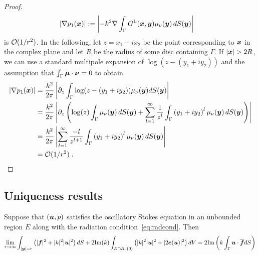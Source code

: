 \begin{proof}
\begin{align}
|\nabla p_1({\boldsymbol x})| &:= \left |-k^2 \nabla \int_\Gamma G^{\textrm{L}}({\boldsymbol x},{\boldsymbol y})
\mu_\nu({\boldsymbol y}) \, dS({\boldsymbol y}) \right |
\end{align}
is $\mathcal{O} (1/r^2)$. In the following, let $z = x_1 + i x_2$ be the
point corresponding to ${\boldsymbol x}$ in the complex plane and let $R$
be the radius of some disc containing $\Gamma$. If $|{\boldsymbol x}| > 2R$,
we can use a standard multipole expansion of $\log(z-(y_1+iy_2))$
and the assumption that $\int_\Gamma {\boldsymbol \mu} \cdot {\boldsymbol \nu} = 0$
to obtain
\begin{align}
|\nabla p_1({\boldsymbol x})| &= \frac{k^2}{2\pi} \left |  \partial_z \int_\Gamma \log(z-(y_1+iy_2))
\mu_\nu({\boldsymbol y}) dS({\boldsymbol y}) \right | \\
&= \frac{k^2}{2\pi} \left |  \partial_z  \left ( \log(z) \int_\Gamma \mu_\nu({\boldsymbol y}) \, dS({\boldsymbol y})
+ \sum_{l=1}^\infty \frac{1}{z^l} \int_\Gamma \left( y_1+iy_2 \right)^l \mu_\nu({\boldsymbol y}) \, dS({\boldsymbol y})
\right ) \right | \\
&= \frac{k^2}{2\pi} \left | \sum_{l=1}^\infty \frac{-l}{z^{l+1}}
\int_\Gamma \left( y_1+iy_2 \right)^l \mu_\nu({\boldsymbol y}) \, dS({\boldsymbol y}) \right | \\
&= \mathcal{O} (1/r^2) \; .
\end{align}
\end{proof}

\subsection{Uniqueness results}


\begin{lem}
\label{lem:rep}
Suppose that $({\boldsymbol u},p)$ satisfies the oscillatory Stokes equation in 
an unbounded region $E$ along with the radiation 
condition~\cref{eq:radcond}. 
Then 
\begin{equation}
\label{eq:repinfest}
\lim_{r\to\infty}
\int_{|{\boldsymbol y}|=r} \left( |{\boldsymbol f}|^2 + |k|^2 |{\boldsymbol u}|^2 \right) dS +
2 {\textrm{\textup{Im}}}(k) \int_{E \cap B_{r}(0)} \left(|k|^2 |{\boldsymbol u}|^2 + |2{\boldsymbol e}({\boldsymbol u})|^2 \right)
dV = 2 {\textrm{\textup{Im}}} \left( k \int_{\Gamma} {\boldsymbol u} \cdot \overline{{\boldsymbol f}} dS  \right)
\end{equation}
\end{lem}

